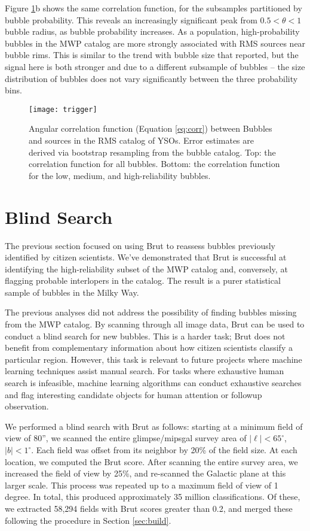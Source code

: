 \documentclass[preprint]{aastex}
\begin{document}
Figure \ref{fig:trigger}b shows the same correlation function, for the subsamples partitioned by bubble probability. This reveals an increasingly significant peak from $0.5 < \theta < 1$ bubble radius, as bubble probability increases. As a population, high-probability bubbles in the MWP catalog are more strongly associated with RMS sources near bubble rims. This is similar to the trend with bubble size that \cite{Kendrew12} reported, but the signal here is both stronger and due to a different subsample of bubbles -- the size distribution of bubbles does not vary significantly between the three probability bins.

\begin{figure}[h!]
\texttt{[image: trigger]}
\caption{Angular correlation function (Equation \ref{eq:corr}) between Bubbles and sources in the RMS catalog of YSOs. Error estimates are derived via bootstrap resampling from the bubble catalog. Top: the correlation function for all bubbles. Bottom: the correlation function for the
low, medium, and high-reliability bubbles.}
\label{fig:trigger}
\end{figure}

\section{Blind Search}
\label{sec:blind}
The previous section focused on using Brut to reassess bubbles previously identified by citizen scientists. We've demonstrated that Brut is successful at identifying the high-reliability subset of the MWP catalog and, conversely, at flagging probable interlopers in the catalog. The result is a purer statistical sample of bubbles in the Milky Way.

The previous analyses did not address the possibility of finding bubbles missing from the MWP catalog. By scanning through all image data, Brut can be used to conduct a blind search for new bubbles. This is a harder task; Brut does not benefit from complementary information about how citizen scientists classify a particular region. However, this task is relevant to future projects where machine learning techniques assist manual search. For tasks where exhaustive human search is infeasible, machine learning algorithms can conduct exhaustive searches and flag interesting candidate objects for human attention or followup observation.

We performed a blind search with Brut as follows: starting at a minimum field of view of 80'', we scanned the entire {\sc glimpse}/{\sc mipsgal} survey area of $|\ell| < 65^\circ$, $|b| < 1^\circ$. Each field was offset from its neighbor by 20\% of the field size. At each location, we computed the Brut score. After scanning the entire survey area, we increased the field of view by 25\%, and re-scanned the Galactic plane at this larger scale. This process was repeated up to a maximum field of view of 1 degree. In total, this produced approximately 35 million classifications. Of these, we extracted 58,294 fields with Brut scores greater than 0.2, and merged these following the procedure in Section \ref{sec:build}. 
\end{document}
